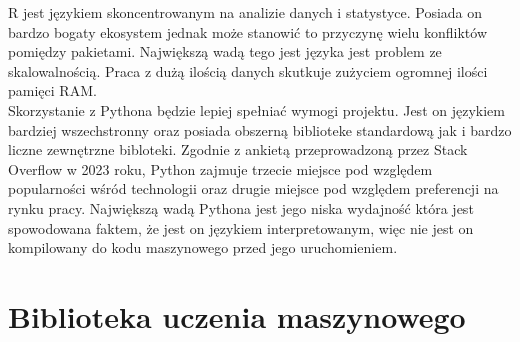 \documentclass[a4paper,twoside,12pt]{book}
\begin{document}
R jest językiem skoncentrowanym na analizie danych i statystyce. Posiada on bardzo bogaty ekosystem jednak może stanowić to przyczynę wielu konfliktów pomiędzy pakietami. Największą wadą tego jest języka jest problem ze skalowalnością. Praca z dużą ilością danych skutkuje zużyciem ogromnej ilości pamięci RAM.\\ Skorzystanie z Pythona będzie lepiej spełniać wymogi projektu. Jest on językiem bardziej wszechstronny oraz posiada obszerną biblioteke standardową jak i bardzo liczne zewnętrzne bibloteki. Zgodnie z ankietą przeprowadzoną przez Stack Overflow w 2023 roku\cite{bib:Stack}, Python zajmuje trzecie miejsce pod względem popularności wśród technologii oraz drugie miejsce pod względem preferencji na rynku pracy. Największą wadą Pythona jest jego niska wydajność która jest spowodowana faktem, że jest on językiem interpretowanym, więc nie jest on kompilowany do kodu maszynowego przed jego uruchomieniem.
\section{Biblioteka uczenia maszynowego}
\end{document}
